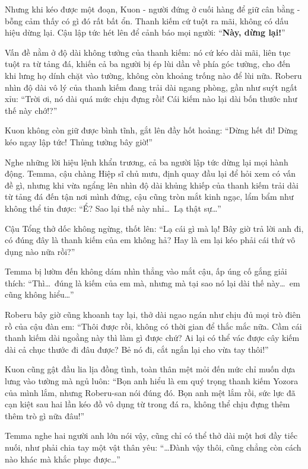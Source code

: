 \documentclass[../main.tex]{subfiles}
\begin{document}
Nhưng khi kéo được một đoạn, Kuon - người đứng ở cuối hàng để giữ cân bằng - bỗng cảm thấy có gì đó rất bất ổn. Thanh kiếm cứ tuột ra mãi, không có dấu hiệu dừng lại. Cậu lập tức hét lên để cảnh báo mọi người: ``\textbf{Này, dừng lại!}''

Vấn đề nằm ở độ dài không tưởng của thanh kiếm: nó cứ kéo dài mãi, liên tục tuột ra từ tảng đá, khiến cả ba người bị ép lùi dần về phía góc tường, cho đến khi lưng họ dính chặt vào tường, không còn khoảng trống nào để lùi nữa. Roberu nhìn độ dài vô lý của thanh kiếm đang trải dài ngang phòng, gần như suýt ngất xỉu: ``Trời ơi, nó dài quá mức chịu đựng rồi! Cái kiếm nào lại dài bốn thước như thế này chớ!?''


Kuon không còn giữ được bình tĩnh, gắt lên đầy hốt hoảng: ``Dừng hết đi! Dừng kéo ngay lập tức! Thủng tường bây giờ!''

Nghe những lời hiệu lệnh khẩn trương, cả ba người lập tức dừng lại mọi hành động. Temma, cậu chàng Hiệp sĩ chủ mưu, định quay đầu lại để hỏi xem có vấn đề gì, nhưng khi vừa ngẩng lên nhìn độ dài khủng khiếp của thanh kiếm trải dài từ tảng đá đến tận nơi mình đứng, cậu cũng tròn mắt kinh ngạc, lẩm bẩm như không thể tin được: ``Ể? Sao lại thế này nhỉ\dots\ Lạ thật sự\dots''

Cậu Tổng thở dốc không ngừng, thốt lên: ``Lạ cái gì mà lạ! Bây giờ trả lời anh đi, có đúng đây là thanh kiếm của em không hả? Hay là em lại kéo phải cái thứ vô dụng nào nữa rồi?''

Temma bị lườm đến không dám nhìn thẳng vào mắt cậu, ấp úng cố gắng giải thích: ``Thì\dots\ đúng là kiếm của em mà, nhưng mà tại sao nó lại dài thế này\dots\ em cũng không hiểu\dots''

Roberu bây giờ cũng khoanh tay lại, thở dài ngao ngán như chịu đủ mọi trò điên rồ của cậu đàn em: ``Thôi được rồi, không có thời gian để thắc mắc nữa. Cầm cái thanh kiếm dài ngoằng này thì làm gì được chứ? Ai lại có thể vác được cây kiếm dài cả chục thước đi đâu được? Bẻ nó đi, cắt ngắn lại cho vừa tay thôi!''

Kuon cũng gật đầu lia lịa đồng tình, toàn thân mệt mỏi đến mức chỉ muốn dựa lưng vào tường mà ngủ luôn: ``Bọn anh hiểu là em quý trọng thanh kiếm Yozora của mình lắm, nhưng Roberu-san nói đúng đó. Bọn anh mệt lắm rồi, sức lực đã cạn kiệt sau hai lần kéo đồ vô dụng từ trong đá ra, không thể chịu đựng thêm thêm trò gì nữa đâu!''

Temma nghe hai người anh lớn nói vậy, cũng chỉ có thể thở dài một hơi đầy tiếc nuối, như phải chia tay một vật thân yêu: ``\dots Đành vậy thôi, cũng chẳng còn cách nào khác mà khắc phục được\dots''
\end{document}
